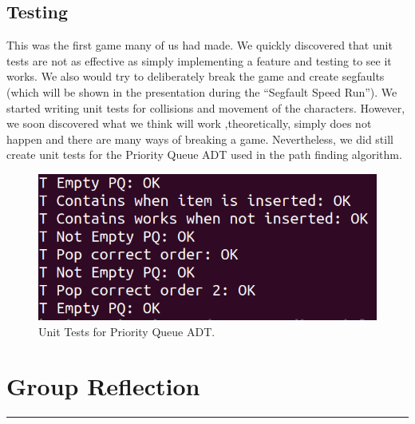 \documentclass{article}
\begin{document}
\subsection{Testing} 
This was the first game many of us had made. We quickly discovered that unit tests are not as effective as simply implementing a feature and testing to see it works. We also would try to deliberately break the game and create segfaults (which will be shown in the presentation during the “Segfault Speed Run”). We started writing unit tests for collisions and movement of the characters. However, we soon discovered what we think will work ,theoretically, simply does not happen and there are many ways of breaking a game. Nevertheless, we did still create unit tests for the Priority Queue ADT used in the path finding algorithm.

\begin{figure}[h!]
\centering
\includegraphics[scale=0.3]{priority_queue_test.png}
\caption{Unit Tests for Priority Queue ADT.}
\end{figure}

\section{Group Reflection}
\rule{\textwidth}{0.05em}
\vspace{0.1em}
\end{document}
